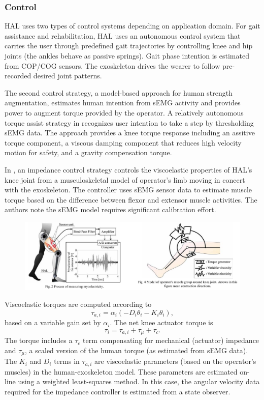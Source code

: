 \begin{refsection}
\subsubsection{Control}

HAL uses two types of control systems depending on application domain.  For gait assistance and rehabilitation, HAL uses an autonomous control system that carries the user through predefined gait trajectories by controlling knee and hip joints (the ankles behave as passive springs).  Gait phase intention is estimated from COP/COG sensors.  The exoskeleton drives the wearer to follow pre-recorded desired joint patterns.

The second control strategy, a model-based approach for human strength augmentation, estimates human intention from sEMG activity and provides power to augment torque provided by the operator.  A relatively autonomous torque assist strategy in \cite{HALmodelControlKnee2010} recognizes user intention to take a step by thresholding sEMG data.  The approach provides a knee torque response including an assitive torque component, a viscous damping component that reduces high velocity motion for safety, and a gravity compensation torque.  

In \cite{HALmuscleImped2005}, an impedance control strategy controls the viscoelastic properties of HAL's knee joint from a musculoskeletal model of operator's limb moving in concert with the exoskeleton.  The controller uses sEMG sensor data to estimate muscle torque based on the difference between flexor and extensor muscle activities.  The authors note the sEMG model requires significant calibration effort.  
%
\begin{figure}[ht]
  \centering
  \includegraphics[width=6in]{exos/figs/hal_viscoelastic_control.png}
\end{figure}
%
%
Viscoelastic torques are computed according to
\[\tau_{a,i} = \alpha_i(-D_i \theta_i - K_i \theta_i),\]  
based on a variable gain set by $\alpha_i$.  The net knee actuator torque is
\[\tau_i = \tau_{a,i} + \tau_\mu + \tau_c .\]
The torque includes a $\tau_c$ term compensating for mechanical (actuator) impedance and $\tau_\mu$, a scaled version of the human torque (as estimated  from sEMG data).  The $K_i$ and $D_i$ terms in $\tau_{a,i}$ are viscoelastic parameters (based on the operator's muscles) in the human-exoskeleton model.  These parameters are estimated on-line using a weighted least-squares method.  In this case, the angular velocity data required for the impedance controller is estimated from a state observer.


\end{refsection}
